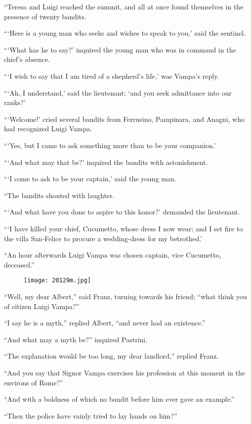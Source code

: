 “Teresa and Luigi reached the summit, and all at once found themselves
in the presence of twenty bandits.

“‘Here is a young man who seeks and wishes to speak to you,’ said the
sentinel.

“‘What has he to say?’ inquired the young man who was in command in the
chief’s absence.

“‘I wish to say that I am tired of a shepherd’s life,’ was Vampa’s
reply.

“‘Ah, I understand,’ said the lieutenant; ‘and you seek admittance into
our ranks?’

“‘Welcome!’ cried several bandits from Ferrusino, Pampinara, and
Anagni, who had recognized Luigi Vampa.

“‘Yes, but I came to ask something more than to be your companion.’

“‘And what may that be?’ inquired the bandits with astonishment.

“‘I come to ask to be your captain,’ said the young man.

“The bandits shouted with laughter.

“‘And what have you done to aspire to this honor?’ demanded the
lieutenant.

“‘I have killed your chief, Cucumetto, whose dress I now wear; and I
set fire to the villa San-Felice to procure a wedding-dress for my
betrothed.’

“An hour afterwards Luigi Vampa was chosen captain, vice Cucumetto,
deceased.”

\begin{figure}[h]
\texttt{[image: 20129m.jpg]}
\end{figure}

“Well, my dear Albert,” said Franz, turning towards his friend; “what
think you of citizen Luigi Vampa?”

“I say he is a myth,” replied Albert, “and never had an existence.”

“And what may a myth be?” inquired Pastrini.

“The explanation would be too long, my dear landlord,” replied Franz.

“And you say that Signor Vampa exercises his profession at this moment
in the environs of Rome?”

“And with a boldness of which no bandit before him ever gave an
example.”

“Then the police have vainly tried to lay hands on him?”

